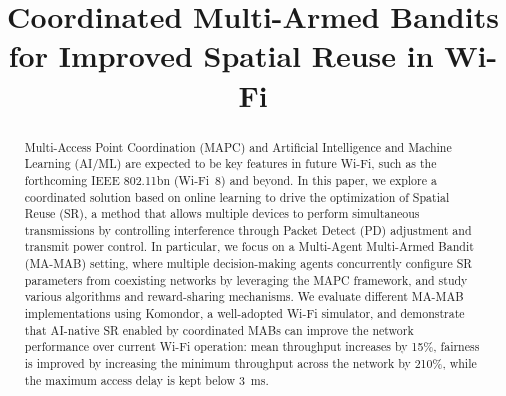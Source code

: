 \documentclass[conference,a4paper]{IEEEtran}
\begin{document}
\title{Coordinated Multi-Armed Bandits for Improved Spatial Reuse in Wi-Fi}

\author{
%
%
}




\maketitle

\begin{abstract}
Multi-Access Point Coordination (MAPC) and Artificial Intelligence and Machine Learning (AI/ML) are expected to be key features in future Wi-Fi, such as the forthcoming IEEE 802.11bn (Wi-Fi~8) and beyond. In this paper, we explore a coordinated solution based on online learning to drive the optimization of Spatial Reuse (SR), a method that allows multiple devices to perform simultaneous transmissions by controlling interference through Packet Detect (PD) adjustment and transmit power control. In particular, we focus on a Multi-Agent Multi-Armed Bandit (MA-MAB) setting, where multiple decision-making agents concurrently configure SR parameters from coexisting networks by leveraging the MAPC framework, and study various algorithms and reward-sharing mechanisms. We evaluate different MA-MAB implementations using Komondor, a well-adopted Wi-Fi simulator, and demonstrate that AI-native SR enabled by coordinated MABs can improve the network performance over current Wi-Fi operation: mean throughput increases by 15\%, fairness is improved by increasing the minimum throughput across the network by 210\%, while the maximum access delay is kept below 3~ms.
\end{abstract}
\end{document}
